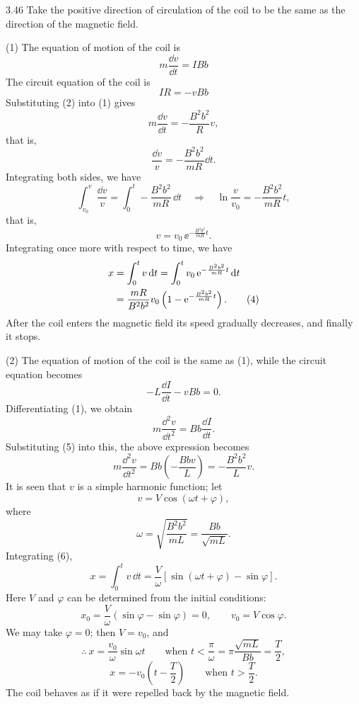 \begin{solution}{3.46}
Take the positive direction of circulation of the coil to be the same as the direction of the magnetic field.

(1) The equation of motion of the coil is
\begin{equation}
m\frac{\dd v}{\dd t}=IBb \tag{1}
\end{equation}
The circuit equation of the coil is
\begin{equation}
IR=-vBb \tag{2}
\end{equation}
Substituting (2) into (1) gives
\[
m\frac{\dd v}{\dd t}=-\frac{B^2b^2}{R}v,
\]
that is,
\[
\frac{\dd v}{v}=-\frac{B^2b^2}{mR}\dd t.
\]
Integrating both sides, we have
\[
\int_{v_0}^{v}\frac{\dd v}{v}=\int_0^t-\frac{B^2b^2}{mR}\,\dd t
\quad\Rightarrow\quad \ln\frac{v}{v_0}=-\frac{B^2b^2}{mR}t,
\]
that is,
\begin{equation}
v=v_0\,\ee^{-\frac{B^2b^2}{mR}t}. \tag{3}
\end{equation}
Integrating once more with respect to time, we have
\begin{align}
x &= \int_0^t v\,\mathrm{d} t=\int_0^t v_0\,\mathrm{e}^{-\frac{B^2b^2}{mR}t}\,\mathrm{d} t\notag\\
&= \frac{mR}{B^2b^2}v_0\left(1-\mathrm{e}^{-\frac{B^2b^2}{mR}t}\right). \tag{4}
\end{align}
After the coil enters the magnetic field its speed gradually decreases, and finally it stops.

(2) The equation of motion of the coil is the same as (1), while the circuit equation becomes
\begin{equation}
-L\frac{\dd I}{\dd t}-vBb=0. \tag{5}
\end{equation}
Differentiating (1), we obtain
\[
m\frac{\dd^2v}{\dd t^2}=Bb\frac{\dd I}{\dd t}.
\]
Substituting (5) into this, the above expression becomes
\[
m\frac{\dd^2v}{\dd t^2}=Bb\left(-\frac{Bbv}{L}\right)=-\frac{B^2b^2}{L}v.
\]
It is seen that $v$ is a simple harmonic function; let
\begin{equation}
v=V\cos(\omega t+\varphi), \tag{6}
\end{equation}
where
\[
\omega=\sqrt{\frac{B^2b^2}{mL}}=\frac{Bb}{\sqrt{mL}}.
\]
Integrating (6),
\[
x=\int_0^t v\,\dd t=\frac{V}{\omega}\left[\sin(\omega t+\varphi)-\sin\varphi\right].
\]
Here $V$ and $\varphi$ can be determined from the initial conditions:
\[
x_0=\frac{V}{\omega}(\sin\varphi-\sin\varphi)=0,\qquad v_0=V\cos\varphi.
\]
We may take $\varphi=0$; then $V=v_0$, and
\[
\therefore\ x=\frac{v_0}{\omega}\sin\omega t
\qquad\text{when } t<\frac{\pi}{\omega}=\pi\frac{\sqrt{mL}}{Bb}=\frac{T}{2},
\]
\[
x=-v_0\left(t-\frac{T}{2}\right)
\qquad\text{when } t>\frac{T}{2}.
\]
The coil behaves as if it were repelled back by the magnetic field.
\end{solution}


